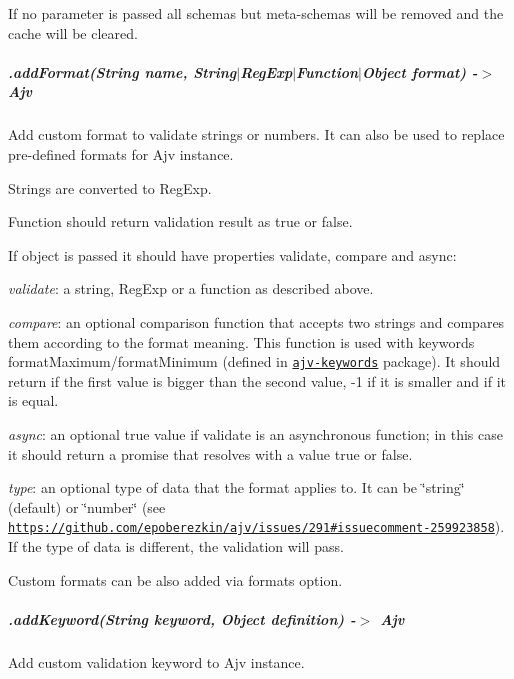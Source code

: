 If no parameter is passed all schemas but meta-\/schemas will be removed and the cache will be cleared.

\subparagraph*{\label{_api-addformat}%
.add\+Format(String name, String$\vert$\+Reg\+Exp$\vert$\+Function$\vert$\+Object format) -\/$>$ Ajv}

Add custom format to validate strings or numbers. It can also be used to replace pre-\/defined formats for Ajv instance.

Strings are converted to Reg\+Exp.

Function should return validation result as {\ttfamily true} or {\ttfamily false}.

If object is passed it should have properties {\ttfamily validate}, {\ttfamily compare} and {\ttfamily async}\+:


\begin{DoxyItemize}
\item {\itshape validate}\+: a string, Reg\+Exp or a function as described above.
\item {\itshape compare}\+: an optional comparison function that accepts two strings and compares them according to the format meaning. This function is used with keywords {\ttfamily format\+Maximum}/{\ttfamily format\+Minimum} (defined in \href{https://github.com/epoberezkin/ajv-keywords}{\tt ajv-\/keywords} package). It should return {} if the first value is bigger than the second value, {\ttfamily -\/1} if it is smaller and {} if it is equal.
\item {\itshape async}\+: an optional {\ttfamily true} value if {\ttfamily validate} is an asynchronous function; in this case it should return a promise that resolves with a value {\ttfamily true} or {\ttfamily false}.
\item {\itshape type}\+: an optional type of data that the format applies to. It can be {\ttfamily \char`\"{}string\char`\"{}} (default) or {\ttfamily \char`\"{}number\char`\"{}} (see \href{https://github.com/epoberezkin/ajv/issues/291#issuecomment-259923858}{\tt https\+://github.\+com/epoberezkin/ajv/issues/291\#issuecomment-\/259923858}). If the type of data is different, the validation will pass.
\end{DoxyItemize}

Custom formats can be also added via {\ttfamily formats} option.

\subparagraph*{\label{_api-addkeyword}%
.add\+Keyword(\+String keyword, Object definition) -\/$>$ Ajv}

Add custom validation keyword to Ajv instance.

